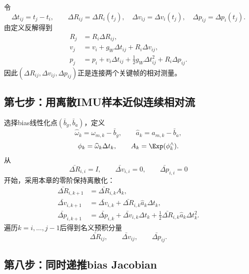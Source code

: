 令
\[
    \Delta t_{ij}=t_j-t_i,
    \qquad
    \Delta R_{ij}=\Delta R_i(t_j),
    \quad
    \Delta v_{ij}=\Delta v_i(t_j),
    \quad
    \Delta p_{ij}=\Delta p_i(t_j).
\]
由定义反解得到
\[
\boxed{
\begin{aligned}
    R_j
    &=R_i\Delta R_{ij},\\
    v_j
    &=v_i+g_W\Delta t_{ij}+R_i\Delta v_{ij},\\
    p_j
    &=p_i+v_i\Delta t_{ij}
      +\frac12g_W\Delta t_{ij}^2
      +R_i\Delta p_{ij}.
\end{aligned}
}
\]
因此$(\Delta R_{ij},\Delta v_{ij},\Delta p_{ij})$正是连接两个关键帧的相对测量。

\subsection*{第七步：用离散IMU样本近似连续相对流}

选择bias线性化点$(\bar b_g,\bar b_a)$，定义
\[
    \widehat\omega_k=\omega_{m,k}-\bar b_g,
    \qquad
    \widehat a_k=a_{m,k}-\bar b_a,
\]
\[
    \phi_k=\widehat\omega_k\Delta t_k,
    \qquad
    A_k=\Exp(\phi_k^\wedge).
\]
从
\[
    \bar{\Delta R}_{i,i}=I,
    \qquad
    \bar{\Delta v}_{i,i}=0,
    \qquad
    \bar{\Delta p}_{i,i}=0
\]
开始，采用本章的零阶保持离散化：
\[
\boxed{
\begin{aligned}
    \bar{\Delta R}_{i,k+1}
    &=\bar{\Delta R}_{i,k}A_k,\\
    \bar{\Delta v}_{i,k+1}
    &=\bar{\Delta v}_{i,k}
      +\bar{\Delta R}_{i,k}\widehat a_k\Delta t_k,\\
    \bar{\Delta p}_{i,k+1}
    &=\bar{\Delta p}_{i,k}
      +\bar{\Delta v}_{i,k}\Delta t_k
      +\frac12\bar{\Delta R}_{i,k}
       \widehat a_k\Delta t_k^2.
\end{aligned}
}
\]
遍历$k=i,\ldots,j-1$后得到名义预积分量
\[
    \bar{\Delta R}_{ij},
    \qquad
    \bar{\Delta v}_{ij},
    \qquad
    \bar{\Delta p}_{ij}.
\]

\subsection*{第八步：同时递推bias Jacobian}

